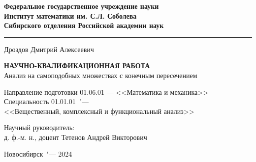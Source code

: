 \thispagestyle{empty}
\begin{center}
\textbf{
Федеральное государственное учреждение науки\\
Институт математики им. С.Л. Соболева\\
Сибирского отделения Российской академии наук}
\end{center}

\noindent\rule{\textwidth}{1pt} %

\vspace{0pt plus4fill}

\begin{center}
{%
Дроздов Дмитрий Алексеевич}
\end{center}

\vspace{0pt plus1fill}

\begin{center}
\textbf {\large %
НАУЧНО-КВАЛИФИКАЦИОННАЯ РАБОТА}\\
{\large Анализ на самоподобных множествах с конечным пересечением}
\end{center}

\vspace{0pt plus2fill} 

{%
\noindent 
Направление подготовки 01.06.01 --- <<Математика и механика>>\\
Специальность 01.01.01\ "---\\
<<Вещественный, комплексный и функциональный анализ>>}


\vspace{0pt plus2fill}

\noindent
Научный руководитель:\\
д. ф.-м. н., доцент Тетенов Андрей Викторович\hspace*{5mm} \underline{\hspace*{40mm}}


\vspace{0pt plus4fill}
{\centering Новосибирск\ "--- 2024\par}